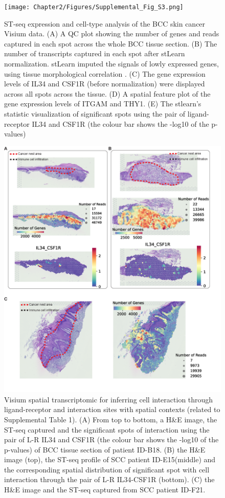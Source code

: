 \begin{figure}[htp]
\renewcommand{\figurename}{Figure}
    \centering
    \texttt{[image: Chapter2/Figures/Supplemental\_Fig\_S3.png]}
    \caption[ST-seq expression and cell-type analysis of the BCC skin cancer Visium data.]{ST-seq expression and cell-type analysis of the BCC skin cancer Visium data. (A) A QC plot showing the number of genes and reads captured in each spot across the whole BCC tissue section. (B) The number of transcripts captured in each spot after stLearn normalization. stLearn imputed the signals of lowly expressed genes, using tissue morphological correlation \cite{pham2020stlearn}. (C) The gene expression levels of IL34 and CSF1R (before normalization) were displayed across all spots across the tissue. (D) A spatial feature plot of the gene expression levels of ITGAM and THY1. (E) The stlearn’s statistic visualization of significant spots using the pair of ligand-receptor IL34 and CSF1R (the colour bar shows the -log10 of the p-values)}
    \label{fig:Chap2_Supfigure3}
\end{figure}
\begin{figure}[htp]
\renewcommand{\figurename}{Figure}
    \centering
    \includegraphics[width=0.75\columnwidth]{Chapter2/Figures/Supplemental_Fig_S4.png}
    \caption[Visium spatial transcriptomic for inferring cell interaction through ligand-receptor and interaction sites with spatial contexts]{Visium spatial transcriptomic for inferring cell interaction through ligand-receptor and interaction sites with spatial contexts (related to Supplemental Table 1). (A) From top to bottom, a H\&E image, the ST-seq captured and the significant spots of interaction using the pair of L-R IL34 and CSF1R (the colour bar shows the -log10 of the p-values) of BCC tissue section of patient ID-B18. (B) the H\&E image (top), the ST-seq profile of SCC patient ID-E15(middle) and the corresponding spatial distribution of significant spot with cell interaction through the pair of L-R IL34-CSF1R (bottom). (C) the H\&E image and the ST-seq captured from SCC patient ID-F21. }
    \label{fig:Chap2_Supfigure4}
\end{figure}

